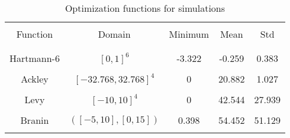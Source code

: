 \begin{table}[t]
\centering
\begin{tabular}{ |c | c | c | c | c | }
  \hline&&&&\\
  Function & Domain & Minimum & Mean & Std\\
  &&&&\\
  \hline
  &&&&\\
  Hartmann-6 & $[0,1]^6$ & -3.322 & -0.259 & 0.383\\
  &&&&\\
  Ackley & $[-32.768, 32.768]^4$ & 0 & 20.882 & 1.027\\
  &&&&\\
  Levy & $[-10, 10]^4$ & 0 & 42.544 & 27.939\\
  &&&&\\
  Branin & $([-5, 10],[0, 15])$ & 0.398 & 54.452 & 51.129\\
  &&&&\\
  \hline
\end{tabular}
\caption{Optimization functions for simulations}
\label{tab:optfunc}
\end{table}


